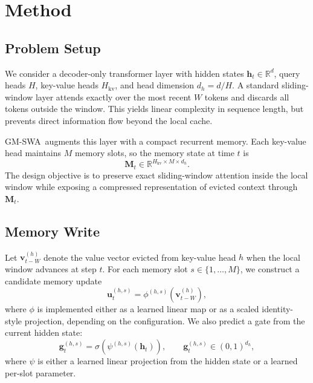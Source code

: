 \documentclass{article}
\newcommand{\model}{GM-SWA}
\begin{document}
\section{Method}

\subsection{Problem Setup}

We consider a decoder-only transformer layer with hidden states $\mathbf{h}_t \in \mathbb{R}^{d}$, query heads $H$, key-value heads $H_{\mathrm{kv}}$, and head dimension $d_h=d/H$. A standard sliding-window layer attends exactly over the most recent $W$ tokens and discards all tokens outside the window. This yields linear complexity in sequence length, but prevents direct information flow beyond the local cache.

\model\ augments this layer with a compact recurrent memory. Each key-value head maintains $M$ memory slots, so the memory state at time $t$ is
\begin{equation}
\mathbf{M}_t \in \mathbb{R}^{H_{\mathrm{kv}} \times M \times d_h}.
\end{equation}
The design objective is to preserve exact sliding-window attention inside the local window while exposing a compressed representation of evicted context through $\mathbf{M}_t$.

\subsection{Memory Write}

Let $\mathbf{v}^{(h)}_{t-W}$ denote the value vector evicted from key-value head $h$ when the local window advances at step $t$. For each memory slot $s \in \{1,\dots,M\}$, we construct a candidate memory update
\begin{equation}
\mathbf{u}^{(h,s)}_t = \phi^{(h,s)}\!\left(\mathbf{v}^{(h)}_{t-W}\right),
\end{equation}
where $\phi$ is implemented either as a learned linear map or as a scaled identity-style projection, depending on the configuration. We also predict a gate from the current hidden state:
\begin{equation}
\mathbf{g}^{(h,s)}_t = \sigma\!\left(\psi^{(h,s)}(\mathbf{h}_t)\right),
\qquad
\mathbf{g}^{(h,s)}_t \in (0,1)^{d_h},
\end{equation}
where $\psi$ is either a learned linear projection from the hidden state or a learned per-slot parameter.
\end{document}
